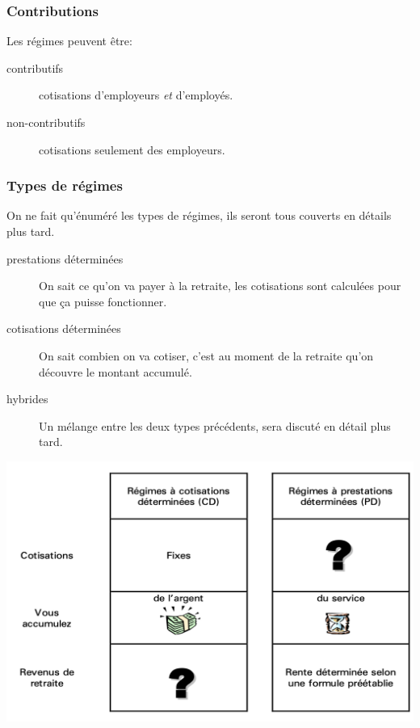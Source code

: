 \documentclass[10pt, french]{article}
\begin{document}
\begin{multicols*}{3}
\subsubsection*{Contributions}
Les régimes peuvent être:
\begin{description}
	\item[contributifs]	cotisations d'employeurs \textit{et} d'employés.
	\item[non-contributifs]	cotisations seulement des employeurs.
\end{description}

\subsubsection*{Types de régimes}

On ne fait qu'énuméré les types de régimes, ils seront tous couverts en détails plus tard.

\begin{description}
	\item[prestations déterminées]	On sait ce qu'on va payer à la retraite, les cotisations sont calculées pour que ça puisse fonctionner.
	\item[cotisations déterminées]	On sait combien on va cotiser, c'est au moment de la retraite qu'on découvre le montant accumulé. 
	\item[hybrides] Un mélange entre les deux types précédents, sera discuté en détail plus tard.
\end{description}

\begin{center}
	\includegraphics[scale=0.33]{src/ACT-1005/CD-PD-table.png}
\end{center}


\end{multicols*}
\end{document}
